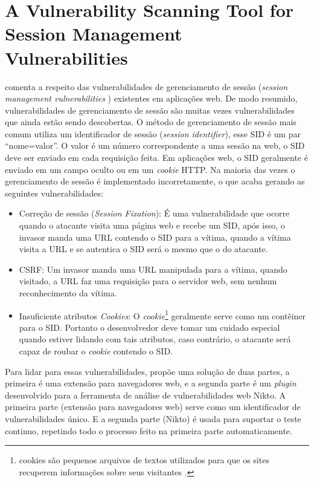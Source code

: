 \section{A Vulnerability Scanning Tool for Session Management Vulnerabilities}
 comenta a respeito das vulnerabilidades de gerenciamento de sessão (\textit{session management vulnerabilities} ) existentes em aplicações web. De modo resumido, vulnerabilidades de gerenciamento de sessão são muitas vezes vulnerabilidades que ainda estão sendo descobertas. O método de gerenciamento de sessão mais comum utiliza um identificador de sessão (\textit{session identifier}), esse \gls{SID} é um par ``nome=valor''. O valor é um número correspondente a uma sessão na web, o \gls{SID} deve ser enviado em cada requisição feita. Em aplicações web, o \gls{SID} geralmente é enviado em um campo oculto ou em um \textit{cookie} HTTP. Na maioria das vezes o gerenciamento de sessão é implementado incorretamente, o que acaba gerando as seguintes vulnerabilidades:
\begin{itemize}
    \item Correção de sessão (\textit{Session Fixation}): É uma vulnerabilidade que ocorre quando o atacante visita uma página web e recebe um \gls{SID}, após isso, o invasor manda uma \gls{URL} contendo o \gls{SID} para a vítima, quando a vítima visita a \gls{URL} e se autentica o \gls{SID} será o mesmo que o do atacante.
    \item \gls{CSRF}: Um invasor manda uma \gls{URL} manipulada para a vítima, quando visitado, a \gls{URL} faz uma requisição para o servidor web, sem nenhum reconhecimento da vítima.
    \item Insuficiente atributos \textit{Cookies}: O \textit{cookie}\footnote{cookies são pequenos arquivos de textos utilizados para que os sites recuperem informações sobre seus visitantes \cite{bishop2005introduction}.} geralmente serve como um contêiner para o \gls{SID}. Portanto o desenvolvedor deve tomar um cuidado especial quando estiver lidando com tais atributos, caso contrário, o atacante será capaz de roubar o \textit{cookie} contendo o \gls{SID}.
\end{itemize}

Para lidar para essas vulnerabilidades,  propõe uma solução de duas partes, a primeira é uma extensão para navegadores web, e a segunda parte é um \textit{plugin} desenvolvido para a ferramenta de análise de vulnerabilidades web Nikto. A primeira parte (extensão para navegadores web) serve como um identificador de vulnerabilidades único. E a segunda parte (Nikto) é usada para suportar o teste continuo, repetindo todo o processo feito na primeira parte automaticamente.

